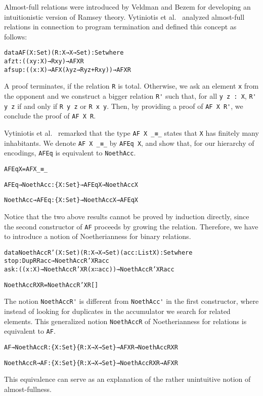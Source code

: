 \documentclass{eptcs}
\begin{document}
Almost-full relations were introduced by Veldman and Bezem \cite{Veldman} for developing
an intuitionistic version of Ramsey theory. Vytiniotis et al.~\cite{Vytiniotis} analyzed almost-full relations in
connection to program termination and defined this concept 
as follows:
\begin{alltt}
data AF (X : Set) (R : X → X → Set) : Set where
  afzt  : ((x y : X) → R x y) → AF X R
  afsup : ((x : X) → AF X (λ y z → R y z + R x y)) → AF X R
\end{alltt}
A proof terminates, if the relation \verb;R; is total. Otherwise, we ask an
element \verb;x; from the opponent and we construct a bigger relation \verb;R';
such that, for all \verb;y z : X;, \verb;R' y z; if and only if \verb;R y z; or
\verb;R x y;. Then, by providing a proof of \verb;AF X R';, we conclude the proof
of \verb;AF X R;.

Vytiniotis et al.~\cite{Vytiniotis} remarked that the type \verb;AF X _≡_;
states that \verb;X; has finitely many inhabitants. We denote
\verb;AF X _≡_; by \verb;AFEq X;, and show that, for our hierarchy of encodings,
\verb;AFEq; is equivalent to \verb;NoethAcc;.
\begin{alltt}
AFEq X = AF X _≡_

AFEq→NoethAcc : \{X : Set\} → AFEq X → NoethAcc X

NoethAcc→AFEq : \{X : Set\} → NoethAcc X → AFEq X
\end{alltt}
Notice that the two above results cannot be proved by induction directly, since
the second constructor of \verb;AF; proceeds by growing the relation. Therefore,
we have to introduce a notion of Noetherianness for binary relations.
\begin{alltt}
data NoethAccR' (X : Set)(R : X → X → Set) (acc : List X) : Set where
  stop : DupR R acc → NoethAccR' X R acc
  ask  : ((x : X) → NoethAccR' X R (x ∷ acc)) → NoethAccR' X R acc

NoethAccR X R = NoethAccR' X R []
\end{alltt}
The notion \verb;NoethAccR'; is different from \verb;NoethAcc'; in the first
constructor, where instead of looking for duplicates in the accumulator we
search for related elements. This generalized notion \verb;NoethAccR; of Noetherianness for relations is equivalent to \verb;AF;.
\begin{alltt}
AF→NoethAccR : \{X : Set\}\{R : X → X → Set\} → AF X R → NoethAccR X R

NoethAccR→AF : \{X : Set\}\{R : X → X → Set\} → NoethAccR X R → AF X R
\end{alltt}
This equivalence can serve as an explanation of the rather unintuitive notion of
almost-fullness.
\end{document}

